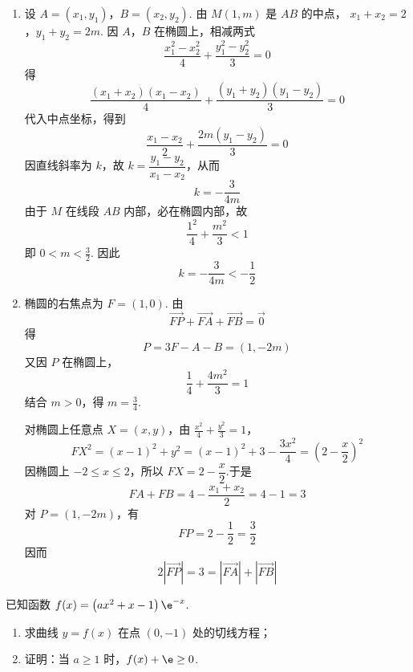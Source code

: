 \begin{solution}
\begin{enumerate}
    \item 设 \(A=(x_1,y_1)\)，\(B=(x_2,y_2)\). 由 \(M(1,m)\) 是 \(AB\) 的中点，
\(x_1+x_2=2\)，\(y_1+y_2=2m\).
    因 \(A\)，\(B\) 在椭圆上，相减两式
    \[
    \frac{x_1^2-x_2^2}{4}+\frac{y_1^2-y_2^2}{3}=0
    \]
    得
    \[
    \frac{(x_1+x_2)(x_1-x_2)}4
    +\frac{(y_1+y_2)(y_1-y_2)}3=0
    \]
    代入中点坐标，得到
    \[
    \frac{x_1-x_2}{2}+\frac{2m(y_1-y_2)}3=0
    \]
    因直线斜率为 \(k\)，故 \(k=\dfrac{y_1-y_2}{x_1-x_2}\)，从而
    \[
    k=-\frac{3}{4m}
    \]
    由于 \(M\) 在线段 \(AB\) 内部，必在椭圆内部，故
    \[
    \frac{1^2}{4}+\frac{m^2}{3}<1
    \]
    即 \(0<m<\frac32\). 因此
    \[
    k=-\frac3{4m}<-\frac12
    \]

    \item 椭圆的右焦点为 \(F=(1,0)\). 由
    \[
    \overrightarrow{FP}+\overrightarrow{FA}+\overrightarrow{FB}=\overrightarrow0
    \]
    得
    \[
    P=3F-A-B=(1,-2m)
    \]
    又因 \(P\) 在椭圆上，
    \[
    \frac{1}{4}+\frac{4m^2}{3}=1
    \]
    结合 \(m>0\)，得 \(m=\frac34\).

    对椭圆上任意点 \(X=(x,y)\)，由 \(\frac{x^2}{4}+\frac{y^2}{3}=1\)，
    \[
    FX^2=(x-1)^2+y^2
    =(x-1)^2+3-\frac{3x^2}{4}
    =\left(2-\frac{x}{2}\right)^2
    \]
    因椭圆上 \(-2\le x\le2\)，所以 \(FX=2-\dfrac{x}{2}\).于是
    \[
    FA+FB=4-\frac{x_1+x_2}{2}=4-1=3
    \]
    对 \(P=(1,-2m)\)，有
    \[
    FP=2-\frac12=\frac32
    \]
    因而
    \[
    2\left|\overrightarrow{FP}\right|=3
    =\left|\overrightarrow{FA}\right|+\left|\overrightarrow{FB}\right|
    \]
\end{enumerate}
\end{solution}

\begin{problem}
已知函数 \(f(x)=\left(ax^2+x-1\right)\e^{-x}\).

\begin{enumerate}
    \item 求曲线 \(y=f(x)\) 在点 \((0,-1)\) 处的切线方程；
    \item 证明：当 \(a\ge1\) 时，\(f(x)+\e\ge0\).
\end{enumerate}
\end{problem}

